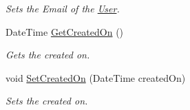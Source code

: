 \begin{DoxyCompactItemize}
\begin{DoxyCompactList}\small\item\em Sets the Email of the \hyperlink{classcom_1_1shephertz_1_1app42_1_1paas_1_1sdk_1_1csharp_1_1user_1_1_user}{User}. \end{DoxyCompactList}\item 
Date\+Time \hyperlink{classcom_1_1shephertz_1_1app42_1_1paas_1_1sdk_1_1csharp_1_1user_1_1_user_adbacef30333757f20f793cfb5effafde}{Get\+Created\+On} ()
\begin{DoxyCompactList}\small\item\em Gets the created on. \end{DoxyCompactList}\item 
void \hyperlink{classcom_1_1shephertz_1_1app42_1_1paas_1_1sdk_1_1csharp_1_1user_1_1_user_afc2b629517c3d798d73578cbe018c311}{Set\+Created\+On} (Date\+Time created\+On)
\begin{DoxyCompactList}\small\item\em Sets the created on. \end{DoxyCompactList}\end{DoxyCompactItemize}

